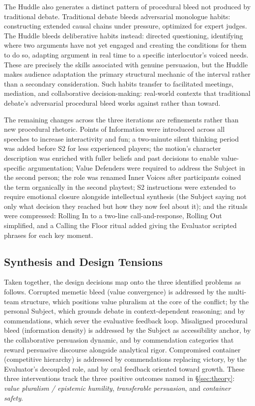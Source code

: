 The Huddle also generates a distinct pattern of procedural bleed \parencite{hugaas2024bleed} not produced by traditional debate. Traditional debate bleeds adversarial monologue habits: constructing extended causal chains under pressure, optimized for expert judges. The Huddle bleeds deliberative habits instead: directed questioning, identifying where two arguments have not yet engaged and creating the conditions for them to do so, adapting argument in real time to a specific interlocutor's voiced needs. These are precisely the skills \textcite{cirlin1997sociological} associated with genuine persuasion, but the Huddle makes audience adaptation the primary structural mechanic of the interval rather than a secondary consideration. Such habits transfer to facilitated meetings, mediation, and collaborative decision-making: real-world contexts that traditional debate's adversarial procedural bleed works against rather than toward.

The remaining changes across the three iterations are refinements rather than new procedural rhetoric. Points of Information were introduced across all speeches to increase interactivity and fun; a two-minute silent thinking period was added before S2 for less experienced players; the motion's character description was enriched with fuller beliefs and past decisions to enable value-specific argumentation; Value Defenders were required to address the Subject in the second person; the role was renamed Inner Voices after participants coined the term organically in the second playtest; S2 instructions were extended to require emotional closure alongside intellectual synthesis (the Subject saying not only what decision they reached but how they now feel about it); and the rituals were compressed: Rolling In to a two-line call-and-response, Rolling Out simplified, and a Calling the Floor ritual added giving the Evaluator scripted phrases for each key moment.

\subsection{Synthesis and Design Tensions}

Taken together, the design decisions map onto the three identified problems as follows. Corrupted memetic bleed (value convergence) is addressed by the multi-team structure, which positions value pluralism at the core of the conflict; by the personal Subject, which grounds debate in context-dependent reasoning; and by commendations, which sever the evaluative feedback loop. Misaligned procedural bleed (information density) is addressed by the Subject as accessibility anchor, by the collaborative persuasion dynamic, and by commendation categories that reward persuasive discourse alongside analytical rigor. Compromised container (competitive hierarchy) is addressed by commendations replacing victory, by the Evaluator's decoupled role, and by oral feedback oriented toward growth. These three interventions track the three positive outcomes named in §\ref{sec:theory}: \textit{value pluralism / epistemic humility}, \textit{transferable persuasion}, and \textit{container safety}.

